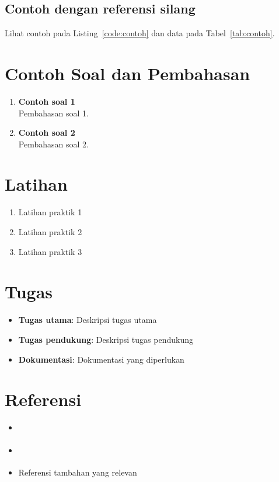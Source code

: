 \subsection{Contoh dengan referensi silang}

Lihat contoh pada Listing~\ref{code:contoh} dan data pada Tabel~\ref{tab:contoh}.

\section{Contoh Soal dan Pembahasan}\label{sec:label-bab-contoh}
\begin{enumerate}
    \item \textbf{Contoh soal 1}\\
    Pembahasan soal 1.

    \item \textbf{Contoh soal 2}\\
    Pembahasan soal 2.
\end{enumerate}

\section{Latihan}\label{sec:label-bab-latihan}
\begin{enumerate}
    \item Latihan praktik 1
    \item Latihan praktik 2
    \item Latihan praktik 3
\end{enumerate}

\section{Tugas}\label{sec:label-bab-tugas}
\begin{itemize}
    \item \textbf{Tugas utama}: Deskripsi tugas utama
    \item \textbf{Tugas pendukung}: Deskripsi tugas pendukung
    \item \textbf{Dokumentasi}: Dokumentasi yang diperlukan
\end{itemize}

\section{Referensi}\label{sec:label-bab-referensi}
\begin{itemize}
    \item \cite{hyde2010art}
    \item \cite{susanto1995belajar}
    \item Referensi tambahan yang relevan
\end{itemize}
